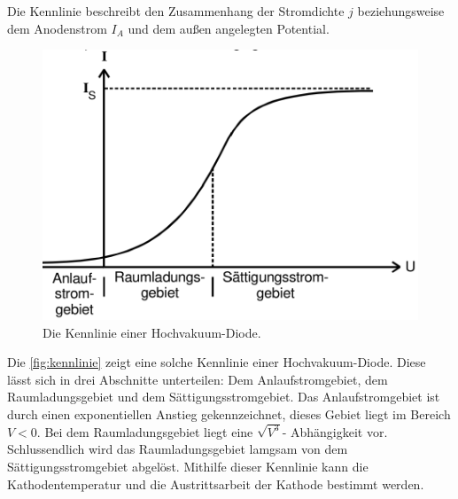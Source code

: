 Die Kennlinie beschreibt den Zusammenhang der Stromdichte $j$ beziehungsweise dem Anodenstrom $I_A$ 
und dem außen angelegten Potential.

\begin{figure}[H]
    \centering
    \includegraphics[width=0.5\linewidth]{content/grafik/kennlinie.png}
    \caption{Die Kennlinie einer Hochvakuum-Diode.\cite{elektron}}
    \label{fig:kennlinie}
\end{figure}

Die \autoref{fig:kennlinie} zeigt eine solche Kennlinie einer Hochvakuum-Diode.  Diese lässt sich in drei Abschnitte 
unterteilen: Dem Anlaufstromgebiet, dem Raumladungsgebiet und dem Sättigungsstromgebiet. Das Anlaufstromgebiet ist durch einen
exponentiellen Anstieg gekennzeichnet, dieses Gebiet liegt im Bereich $V < 0$. Bei dem Raumladungsgebiet liegt eine
$\sqrt{V^3}$- Abhängigkeit vor. Schlussendlich wird das Raumladungsgebiet lamgsam von dem Sättigungsstromgebiet abgelöst. 
Mithilfe dieser Kennlinie kann die Kathodentemperatur und die Austrittsarbeit der Kathode bestimmt werden.
